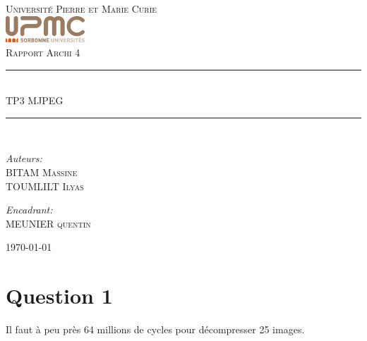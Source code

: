 \documentclass[12pt]{article}
\newcommand{\HRule}{\rule{\linewidth}{0.5mm}}
\begin{document}
\begin{titlepage}
  \begin{center}
    \textsc{\LARGE Université Pierre et Marie Curie}\\[1.5cm]
    \includegraphics[height=1cm]{upmc.png}\\[1.5cm]
    \textsc{\Large Rapport Archi 4 }\\[2cm]
    \HRule \\[1cm]
    \textsc{\huge TP3 MJPEG }\\[0.5cm]
    \HRule \\[1cm]
    \noindent
    \begin{minipage}[t]{0.55\textwidth}
      \begin{flushleft} \large
        \emph{Auteurs:}\\
        BITAM \textsc{Massine}\\
        TOUMLILT \textsc{Ilyas}
      \end{flushleft}
    \end{minipage}%
    \begin{minipage}[t]{0.47\textwidth}
      \begin{flushright} \large
        \emph{Encadrant:} \\
        MEUNIER \textsc{quentin}
      \end{flushright}
    \end{minipage}
    \vfill
    {\large \today}
  \end{center}
\end{titlepage}
\section*{Question 1}
Il faut à peu près 64 millions de cycles pour décompresser 25 images.
\end{document}
